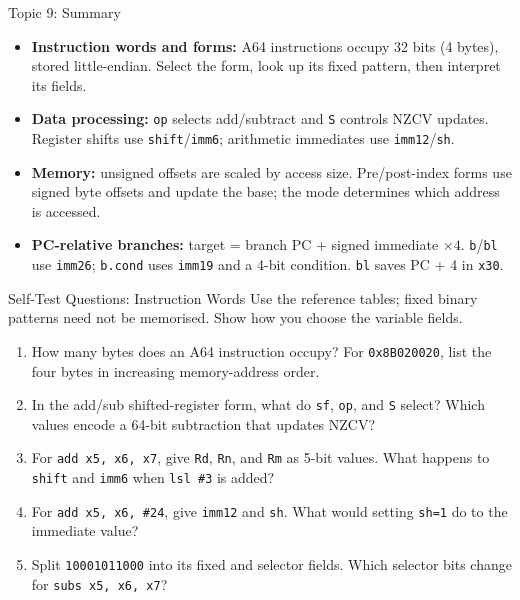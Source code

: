 \documentclass[aspectratio=169,11pt,t]{beamer}
\newcommand{\key}[1]{\textbf{#1}}
\newcommand{\hex}[1]{\texttt{0x#1}}
\newcommand{\code}[1]{\texttt{#1}}
\begin{document}
\begin{frame}{Topic 9: Summary}
\small
{}
\begin{itemize}\setlength{\itemsep}{9pt}
\item \key{Instruction words and forms:} A64 instructions occupy 32 bits (4 bytes), stored little-endian. Select the form, look up its fixed pattern, then interpret its fields.
\item \key{Data processing:} \code{op} selects add/subtract and \code{S} controls NZCV updates. Register shifts use \code{shift}/\code{imm6}; arithmetic immediates use \code{imm12}/\code{sh}.
\item \key{Memory:} unsigned offsets are scaled by access size. Pre/post-index forms use signed byte offsets and update the base; the mode determines which address is accessed.
\item \key{PC-relative branches:} target = branch PC + signed immediate $\times 4$. \code{b}/\code{bl} use \code{imm26}; \code{b.cond} uses \code{imm19} and a 4-bit condition. \code{bl} saves PC + 4 in \code{x30}.
\end{itemize}
\end{frame}


\begin{frame}{Self-Test Questions: Instruction Words}
\small
Use the reference tables; fixed binary patterns need not be memorised. Show how you choose the variable fields.
\begin{enumerate}\setlength{\itemsep}{8pt}
\item How many bytes does an A64 instruction occupy? For \hex{8B020020}, list the four bytes in increasing memory-address order.
\item In the add/sub shifted-register form, what do \code{sf}, \code{op}, and \code{S} select? Which values encode a 64-bit subtraction that updates NZCV?
\item For \code{add x5, x6, x7}, give \code{Rd}, \code{Rn}, and \code{Rm} as 5-bit values. What happens to \code{shift} and \code{imm6} when \code{lsl \#3} is added?
\item For \code{add x5, x6, \#24}, give \code{imm12} and \code{sh}. What would setting \code{sh=1} do to the immediate value?
\item Split \code{10001011000} into its fixed and selector fields. Which selector bits change for \code{subs x5, x6, x7}?
\end{enumerate}
\end{frame}
\end{document}
